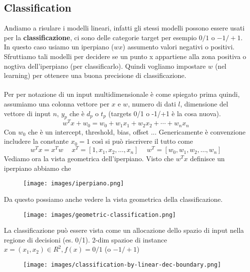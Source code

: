\subsection{Classification}
Andiamo a risulare i modelli lineari, infatti gli stessi modelli possono essere usati per la \textbf{classificazione}, ci sono delle categorie target per esempio $0/1$ o $-1/+1$. In questo caso usiamo
un iperpiano ($wx$) assumento valori negativi o positivi. Sfruttiamo tali modelli per decidere se un punto x appartiene alla zona positiva o nogtiva 
dell'iperpiano (per classificarlo). Quindi vogliamo impostare $w$ (nel learning) per ottenere una buona precisione di classificazione.\\\\
Per per notazione di un input multidimensionale è come spiegato prima quindi, assumiamo una colonna vettore per $x$ e $w$, numero di dati $l$, dimensione
del vettore di input $n$, $y_p$ che è $d_p$ o $t_p$ (targets 0/1 o -1/+1 è la cosa nuova).
$$w^Tx + w_0 = w_0 + w_1x_1 + w_2 x_2 + \cdots + w_n x_n$$
Con $w_0$ che è un intercept, threshold, bias, offset ... Genericamente è convenzione includere la constante $x_0 = 1$ così si può riscrivere il tutto come
$$w^T x = x^T w \hspace{15pt} x^T = [1, x_1, x_2, \dots, x_n] \hspace{15pt} w^T = [w_0, w_1, w_2, \dots, w_n]$$ 
Vediamo ora la vista geometrica dell'iperpiano. Visto che $w^T x$ definisce un iperpiano abbiamo che
\begin{figure}[h!]
    \centering
    \texttt{[image: images/iperpiano.png]}
\end{figure}

\hspace{-15pt}Da questo possiamo anche vedere la vista geometrica della classificazione.
\begin{figure}[h!]
    \centering
    \texttt{[image: images/geometric-classification.png]}
\end{figure}
La classificazione può essere vista come un allocazione dello spazio di input nella regione di decisioni (es. 0/1). 2-dim spazioe di instance
$x=(x_1, x_2) \in R^2, f(x) = 0/1$ (o $-1/+1$) 
\begin{figure}[h!]
    \centering
    \texttt{[image: images/classification-by-linear-dec-boundary.png]}
\end{figure}